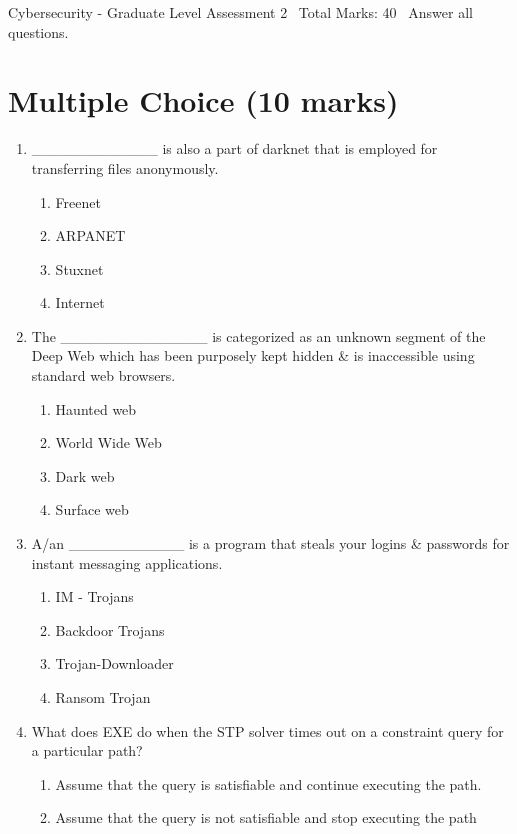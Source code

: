 \documentclass[12pt]{article}
\begin{document}
\begin{center}
Cybersecurity - Graduate Level Assessment 2 \
Total Marks: 40 \
Answer all questions.
\end{center}

\section*{Multiple Choice (10 marks)}
\begin{enumerate}[label=\arabic*.]
\item \_\_\_\_\_\_\_\_\_\_\_\_ is also a part of darknet that is employed for transferring files anonymously.
\begin{enumerate}[label=(\alph*)]
    \item Freenet
    \item ARPANET
    \item Stuxnet
    \item Internet
\end{enumerate}
\item The \_\_\_\_\_\_\_\_\_\_\_\_\_\_ is categorized as an unknown segment of the Deep Web which has been purposely kept hidden \& is inaccessible using standard web browsers.
\begin{enumerate}[label=(\alph*)]
    \item Haunted web
    \item World Wide Web
    \item Dark web
    \item Surface web
\end{enumerate}
\item A/an \_\_\_\_\_\_\_\_\_\_\_ is a program that steals your logins \& passwords for instant messaging applications.
\begin{enumerate}[label=(\alph*)]
    \item IM - Trojans
    \item Backdoor Trojans
    \item Trojan-Downloader
    \item Ransom Trojan
\end{enumerate}
\item What does EXE do when the STP solver times out on a constraint query for a particular path?
\begin{enumerate}[label=(\alph*)]
    \item Assume that the query is satisfiable and continue executing the path.
    \item Assume that the query is not satisfiable and stop executing the path

\end{enumerate}
\end{enumerate}
\end{document}

